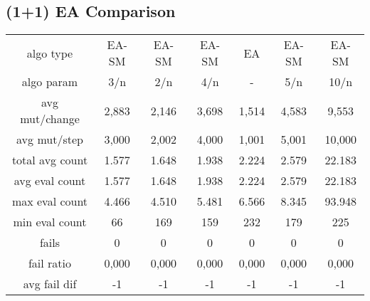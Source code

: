\subsection{(1+1) EA Comparison}

\begin{tabular}[h]{ccccccc}
algo type&             EA-SM&      EA-SM&      EA-SM&         EA&      EA-SM&      EA-SM\\
algo param&              3/n&        2/n&        4/n&          -&        5/n&       10/n\\
avg mut/change&        2,883&      2,146&      3,698&      1,514&      4,583&      9,553\\
avg mut/step&          3,000&      2,002&      4,000&      1,001&      5,001&     10,000\\
\hline
total avg count&       1.577&      1.648&      1.938&      2.224&      2.579&     22.183\\
avg eval count&        1.577&      1.648&      1.938&      2.224&      2.579&     22.183\\
max eval count&        4.466&      4.510&      5.481&      6.566&      8.345&     93.948\\
min eval count&           66&        169&        159&        232&        179&        225\\
\hline
fails&                     0&          0&          0&          0&          0&          0\\
fail ratio&            0,000&      0,000&      0,000&      0,000&      0,000&      0,000\\
avg fail dif&             -1&         -1&         -1&         -1&         -1&         -1\\
\end{tabular}

